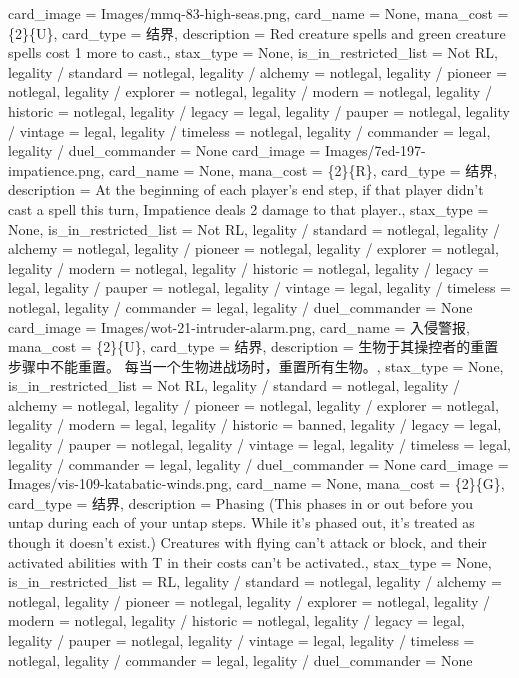 \documentclass[lang = cn, color = black, 10pt]{AllThatStax}
\begin{document}
\card
{
	card_image = Images/mmq-83-high-seas.png,
	card_name = None,
	mana_cost = \{2\}\{U\},
	card_type = 结界,
	description = Red creature spells and green creature spells cost {1} more to cast.,
	stax_type = None,
	is_in_restricted_list = Not RL,
	legality / standard = notlegal,
	legality / alchemy = notlegal,
	legality / pioneer = notlegal,
	legality / explorer = notlegal,
	legality / modern = notlegal,
	legality / historic = notlegal,
	legality / legacy = legal,
	legality / pauper = notlegal,
	legality / vintage = legal,
	legality / timeless = notlegal,
	legality / commander = legal,
	legality / duel_commander = None
}
\card
{
	card_image = Images/7ed-197-impatience.png,
	card_name = None,
	mana_cost = \{2\}\{R\},
	card_type = 结界,
	description = At the beginning of each player's end step, if that player didn't cast a spell this turn, Impatience deals 2 damage to that player.,
	stax_type = None,
	is_in_restricted_list = Not RL,
	legality / standard = notlegal,
	legality / alchemy = notlegal,
	legality / pioneer = notlegal,
	legality / explorer = notlegal,
	legality / modern = notlegal,
	legality / historic = notlegal,
	legality / legacy = legal,
	legality / pauper = notlegal,
	legality / vintage = legal,
	legality / timeless = notlegal,
	legality / commander = legal,
	legality / duel_commander = None
}
\card
{
	card_image = Images/wot-21-intruder-alarm.png,
	card_name = 入侵警报,
	mana_cost = \{2\}\{U\},
	card_type = 结界,
	description = 生物于其操控者的重置步骤中不能重置。
	每当一个生物进战场时，重置所有生物。,
	stax_type = None,
	is_in_restricted_list = Not RL,
	legality / standard = notlegal,
	legality / alchemy = notlegal,
	legality / pioneer = notlegal,
	legality / explorer = notlegal,
	legality / modern = legal,
	legality / historic = banned,
	legality / legacy = legal,
	legality / pauper = notlegal,
	legality / vintage = legal,
	legality / timeless = legal,
	legality / commander = legal,
	legality / duel_commander = None
}
\card
{
	card_image = Images/vis-109-katabatic-winds.png,
	card_name = None,
	mana_cost = \{2\}\{G\},
	card_type = 结界,
	description = Phasing (This phases in or out before you untap during each of your untap steps. While it's phased out, it's treated as though it doesn't exist.)
	Creatures with flying can't attack or block, and their activated abilities with {T} in their costs can't be activated.,
	stax_type = None,
	is_in_restricted_list = RL,
	legality / standard = notlegal,
	legality / alchemy = notlegal,
	legality / pioneer = notlegal,
	legality / explorer = notlegal,
	legality / modern = notlegal,
	legality / historic = notlegal,
	legality / legacy = legal,
	legality / pauper = notlegal,
	legality / vintage = legal,
	legality / timeless = notlegal,
	legality / commander = legal,
	legality / duel_commander = None
}
\end{document}
